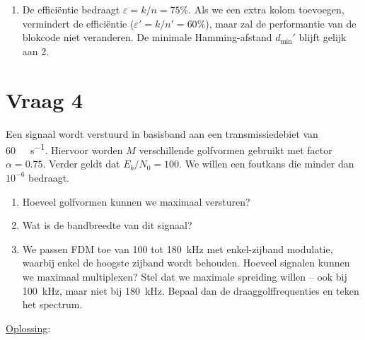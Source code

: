 \documentclass{kuburgiearticle}
\let\epsilon\varepsilon
\begin{document}
\begin{enumerate}
		\item De efficiëntie bedraagt \(\epsilon = k/n = 75\%\). Als we een extra kolom toevoegen, vermindert de efficiëntie (\(\epsilon' = k/n' = 60\%\)), maar zal de performantie van de blokcode niet veranderen. De minimale Hamming-afstand \(d_{\min}'\) blijft gelijk aan 2.
	\end{enumerate}

	\section*{Vraag 4}

	Een signaal wordt verstuurd in basisband aan een transmissiedebiet van \SI{60}{\kilo\bit\per\second}. Hiervoor worden \(M\) verschillende golfvormen gebruikt met factor \(\alpha = 0.75\). Verder geldt dat \(E_b/N_0=100\). We willen een foutkans die minder dan \(10^{-6}\) bedraagt.

	\begin{enumerate}
		\item Hoeveel golfvormen kunnen we maximaal versturen?
		\item Wat is de bandbreedte van dit signaal?
		\item We passen FDM toe van 100 tot \SI{180}{\kilo\hertz} met enkel-zijband modulatie, waarbij enkel de hoogste zijband wordt behouden. Hoeveel signalen kunnen we maximaal multiplexen? Stel dat we maximale spreiding willen -- ook bij \SI{100}{\kilo\hertz}, maar niet bij \SI{180}{\kilo\hertz}. Bepaal dan de draaggolffrequenties en teken het spectrum.
	\end{enumerate}

	\newpage
	\underline{Oplossing}:
\end{document}
